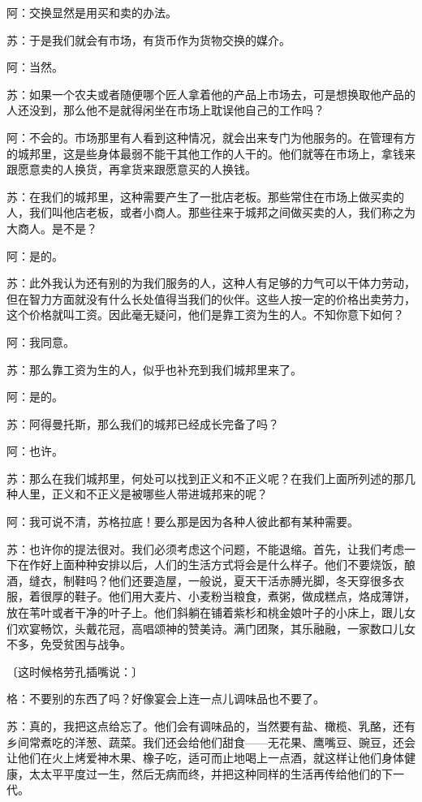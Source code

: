 \documentclass[12pt,oneside]{book}
\begin{document}
阿：交换显然是用买和卖的办法。

苏：于是我们就会有市场，有货币作为货物交换的媒介。

阿：当然。

苏：如果一个农夫或者随便哪个匠人拿着他的产品上市场去，可是想换取他产品的人还没到，那么他不是就得闲坐在市场上耽误他自己的工作吗？

阿：不会的。市场那里有人看到这种情况，就会出来专门为他服务的。在管理有方的城邦里，这是些身体最弱不能干其他工作的人干的。他们就等在市场上，拿钱来跟愿意卖的人换货，再拿货来跟愿意买的人换钱。

苏：在我们的城邦里，这种需要产生了一批店老板。那些常住在市场上做买卖的人，我们叫他店老板，或者小商人。那些往来于城邦之间做买卖的人，我们称之为大商人。是不是？

阿：是的。

苏：此外我认为还有别的为我们服务的人，这种人有足够的力气可以干体力劳动，但在智力方面就没有什么长处值得当我们的伙伴。这些人按一定的价格出卖劳力，这个价格就叫工资。因此毫无疑问，他们是靠工资为生的人。不知你意下如何？

阿：我同意。

苏：那么靠工资为生的人，似乎也补充到我们城邦里来了。

阿：是的。

苏：阿得曼托斯，那么我们的城邦已经成长完备了吗？

阿：也许。

苏：那么在我们城邦里，何处可以找到正义和不正义呢？在我们上面所列述的那几种人里，正义和不正义是被哪些人带进城邦来的呢？

阿：我可说不清，苏格拉底！要么那是因为各种人彼此都有某种需要。

苏：也许你的提法很对。我们必须考虑这个问题，不能退缩。首先，让我们考虑一下在作好上面种种安排以后，人们的生活方式将会是什么样子。他们不要烧饭，酿酒，缝衣，制鞋吗？他们还要造屋，一般说，夏天干活赤膊光脚，冬天穿很多衣服，着很厚的鞋子。他们用大麦片、小麦粉当粮食，煮粥，做成糕点，烙成薄饼，放在苇叶或者干净的叶子上。他们斜躺在铺着紫杉和桃金娘叶子的小床上，跟儿女们欢宴畅饮，头戴花冠，高唱颂神的赞美诗。满门团聚，其乐融融，一家数口儿女不多，免受贫困与战争。

〔这时候格劳孔插嘴说：〕

格：不要别的东西了吗？好像宴会上连一点儿调味品也不要了。

苏：真的，我把这点给忘了。他们会有调味品的，当然要有盐、橄榄、乳酪，还有乡间常煮吃的洋葱、蔬菜。我们还会给他们甜食——无花果、鹰嘴豆、豌豆，还会让他们在火上烤爱神木果、橡子吃，适可而止地喝上一点酒，就这样让他们身体健康，太太平平度过一生，然后无病而终，并把这种同样的生活再传给他们的下一代。
\end{document}
